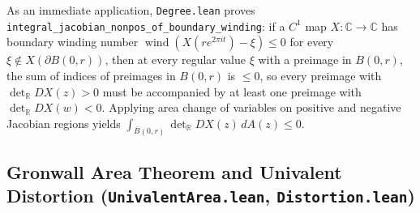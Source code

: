\documentclass[11pt,reqno]{amsart}
\theoremstyle{definition}
\newcommand{\C}{\mathbb{C}}
\newcommand{\R}{\mathbb{R}}
\newcommand{\detR}{\det_{\R}}
\newcommand{\wind}{\operatorname{wind}}
\begin{document}
As an immediate application, \texttt{Degree.lean} proves \texttt{integral\_jacobian\_nonpos\_of\_boundary\_winding}: if a $C^1$ map $X : \C \to \C$ has boundary winding number $\wind(X(r e^{2\pi i t}) - \xi) \le 0$ for every $\xi \notin X(\partial B(0,r))$, then at every regular value $\xi$ with a preimage in $B(0,r)$, the sum of indices of preimages in $B(0,r)$ is $\le 0$, so every preimage with $\detR DX(z) > 0$ must be accompanied by at least one preimage with $\detR DX(w) < 0$. Applying area change of variables on positive and negative Jacobian regions yields $\int_{\overline{B}(0,r)} \detR DX(z)\,dA(z) \le 0$.

\subsection{Gronwall Area Theorem and Univalent Distortion (\texttt{UnivalentArea.lean}, \texttt{Distortion.lean})}
\end{document}

